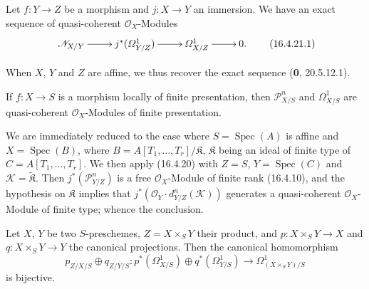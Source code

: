 \begin{corollary}[16.4.21]
\label{IV.16.4.21}
Let $f:Y\to Z$ be a morphism and $j:X\to Y$ an immersion. We have an exact
sequence of quasi-coherent $\mathcal{O}_X$-Modules
\[
  \xymatrix{
    \mathscr{N}_{X/Y}\ar[r]&j^*(\varOmega_{Y/Z}^1)\ar[r]&
    \varOmega_{X/Z}^1\ar[r]&0.
  }
  \tag{16.4.21.1}
  \label{IV.16.4.21.1}
\]
\end{corollary}

When $X$, $Y$ and $Z$ are affine, we thus recover the exact sequence
(\textbf{0}, 20.5.12.1).

\begin{corollary}[16.4.22]
\label{IV.16.4.22}
If $f:X\to S$ is a morphism locally of finite presentation, then
$\mathscr{P}_{X/S}^n$ and $\varOmega_{X/S}^1$ are quasi-coherent
$\mathcal{O}_X$-Modules of finite presentation.
\end{corollary}

We are immediately reduced to the case where $S=\operatorname{Spec}(A)$ is affine
and $X=\operatorname{Spec}(B)$, where
$B=A[T_1,\ldots,T_r]/\mathfrak{K}$, $\mathfrak{K}$ being an ideal of finite
type of $C=A[T_1,\ldots,T_r]$. We then apply (16.4.20) with $Z=S$,
$Y=\operatorname{Spec}(C)$ and $\mathscr{K}=\widetilde{\mathfrak{K}}$. Then
$j^*(\mathscr{P}_{Y/Z}^n)$ is a free $\mathcal{O}_X$-Module of finite rank
(16.4.10), and the hypothesis on $\mathfrak{K}$ implies that
$j^*(\mathcal{O}_Y\cdot d_{Y/Z}^n(\mathscr{K}))$ generates a quasi-coherent
$\mathcal{O}_X$-Module of finite type; whence the conclusion.

\begin{proposition}[16.4.23]
\label{IV.16.4.23}
Let $X$, $Y$ be two $S$-preschemes, $Z=X\times_S Y$ their product, and
$p:X\times_S Y\to X$ and $q:X\times_S Y\to Y$ the canonical projections.
Then the canonical homomorphism
\[
  p_{Z/X/S}\oplus q_{Z/Y/S}:
  p^*(\varOmega_{X/S}^1)\oplus q^*(\varOmega_{Y/S}^1)
  \longrightarrow\varOmega_{(X\times_S Y)/S}^1
  \tag{16.4.23.1}
  \label{IV.16.4.23.1}
\]
is bijective.
\end{proposition}

